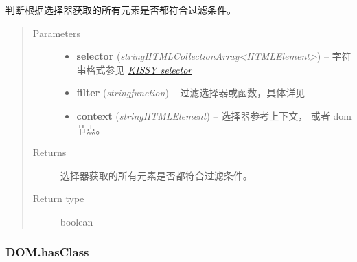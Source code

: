 \documentclass[letterpaper,10pt,english]{sphinxmanual}
\begin{document}
\begin{fulllineitems}
\label{api/core/dom/test:DOM.test}
判断根据选择器获取的所有元素是否都符合过滤条件。
\begin{quote}\begin{description}
\item[{Parameters}] \leavevmode\begin{itemize}
\item {}
\textbf{selector} (\emph{string\textbar{}HTMLCollection\textbar{}Array\textless{}HTMLElement\textgreater{}}) -- 字符串格式参见 {\hyperref[api/core/dom/selector:dom-selector]{\emph{KISSY selector}}}

\item {}
\textbf{filter} (\emph{string\textbar{}function}) -- 过滤选择器或函数，具体详见 {\hyperref[api/core/dom/filter:DOM.filter]{}}

\item {}
\textbf{context} (\emph{string\textbar{}HTMLElement}) -- 选择器参考上下文，  或者 dom 节点。

\end{itemize}

\item[{Returns}] \leavevmode
选择器获取的所有元素是否都符合过滤条件。

\item[{Return type}] \leavevmode
boolean

\end{description}\end{quote}

\end{fulllineitems}



\subsubsection{DOM.hasClass}
\label{api/core/dom/hasClass::doc}\label{api/core/dom/hasClass:dom-hasclass}
\end{document}

